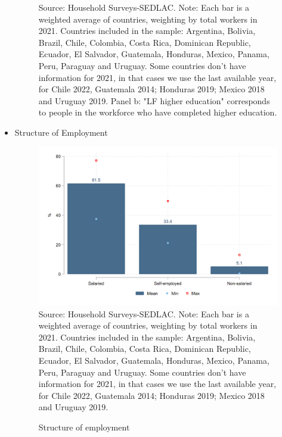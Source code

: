 \documentclass[english]{article}
\begin{document}
\begin{itemize}
\begin{figure}[!htb]
\footnotesize{Source: Household Surveys-SEDLAC.}
\footnotesize{Note: Each bar is a weighted average of countries, weighting by total workers in 2021. Countries included in the sample: Argentina, Bolivia, Brazil, Chile, Colombia, Costa Rica, Dominican Republic, Ecuador, El Salvador, Guatemala, Honduras, Mexico, Panama, Peru, Paraguay and Uruguay. Some countries don’t have information for 2021, in that cases we use the last available year, for Chile 2022, Guatemala 2014; Honduras 2019; Mexico 2018 and Uruguay 2019. Panel b: "LF higher education" corresponds to people in the workforce who have completed higher education.}

\end{figure}
  
    \item Structure of Employment
    
        \begin{figure}[!htb]
        \justifying
        \caption{Structure of employment}     
        \includegraphics[scale=.3]{latex/figures/Snapshot/Structure of employment.png}
        \label{fig:employment}
        \footnotesize{Source: Household Surveys-SEDLAC.}
        \footnotesize{Note: Each bar is a weighted average of countries, weighting by total workers in 2021. Countries included in the sample: Argentina, Bolivia, Brazil, Chile, Colombia, Costa Rica, Dominican Republic, Ecuador, El Salvador, Guatemala, Honduras, Mexico, Panama, Peru, Paraguay and Uruguay. Some countries don’t have information for 2021, in that cases we use the last available year, for Chile 2022, Guatemala 2014; Honduras 2019; Mexico 2018 and Uruguay 2019.}
        \end{figure}


\end{itemize}
\end{document}
